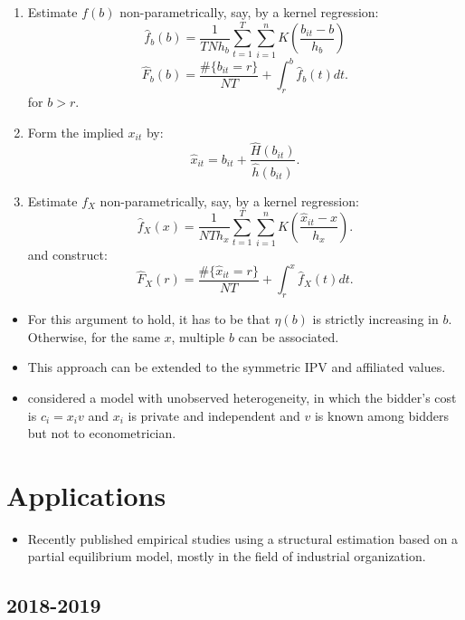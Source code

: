 \documentclass[
]{book}
\providecommand{\tightlist}{%
  \setlength{\itemsep}{0pt}\setlength{\parskip}{0pt}}
\begin{document}
\begin{enumerate}
\def\labelenumi{\arabic{enumi}.}
\tightlist
\item
  Estimate \(f(b)\) non-parametrically, say, by a kernel regression:
  \[
  \hat{f}_b(b) = \frac{1}{TN h_b}\sum_{t = 1}^T \sum_{i = 1}^n K\left(\frac{b_{it} - b}{h_b}\right)
  \]
  \[
  \widehat{F}_b(b) = \frac{\#\{b_{it} = r\}}{NT} +  \int_{r}^b \hat{f}_b(t) dt.
  \]
  for \(b > r\).
\item
  Form the implied \(x_{it}\) by:
  \[
  \hat{x}_{it} = b_{it} + \frac{\widehat{H}(b_{it})}{\hat{h}(b_{it})}.
  \]
\item
  Estimate \(f_X\) non-parametrically, say, by a kernel regression:
  \[
  \hat{f}_X(x) = \frac{1}{NT h_x} \sum_{t = 1}^T \sum_{i = 1}^n K\left(\frac{\hat{x}_{it} - x}{h_x}\right).
  \]
  and construct:
  \[
  \widehat{F}_X(r) = \frac{\#\{\hat{x}_{it} = r\}}{NT} + \int_r^x \hat{f}_X(t) dt.
  \]
\end{enumerate}

\begin{itemize}
\tightlist
\item
  For this argument to hold, it has to be that \(\eta(b)\) is strictly increasing in \(b\). Otherwise, for the same \(x\), multiple \(b\) can be associated.
\item
  This approach can be extended to the symmetric IPV and affiliated values.
\item
  \citet{krasnokutskayaIdentificationEstimationAuction2011} considered a model with unobserved heterogeneity, in which the bidder's cost is \(c_i = x_i v\) and \(x_i\) is private and independent and \(v\) is known among bidders but not to econometrician.
\end{itemize}

\hypertarget{applications}{%
\chapter{Applications}\label{applications}}

\begin{itemize}
\tightlist
\item
  Recently published empirical studies using a structural estimation based on a partial equilibrium model, mostly in the field of industrial organization.
\end{itemize}

\hypertarget{section}{%
\section{2018-2019}\label{section}}
\end{document}
